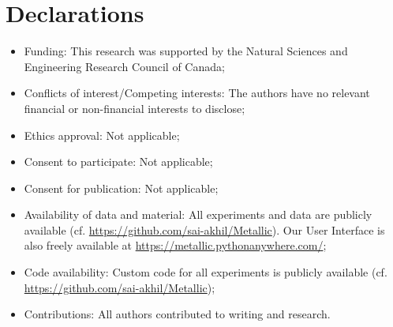 \documentclass{article}
\begin{document}

\section*{Declarations}

\begin{itemize}
    \item Funding: This research was supported by the Natural Sciences and Engineering Research Council of Canada;
    \item Conflicts of interest/Competing interests: The authors have no relevant financial or non-financial interests to disclose;
    \item Ethics approval: Not applicable;
    \item Consent to participate: Not applicable;
    \item Consent for publication: Not applicable;
    \item Availability of data and material: All experiments and data are publicly available (cf. \url{https://github.com/sai-akhil/Metallic}). Our User Interface is also freely available at \url{https://metallic.pythonanywhere.com/};
    \item Code availability: Custom code for all experiments is publicly available (cf. \url{https://github.com/sai-akhil/Metallic});
    \item Contributions: All authors contributed to writing and research.
\end{itemize}

\begin{flushleft}
\printbibliography{}
\end{flushleft}
\end{document}
